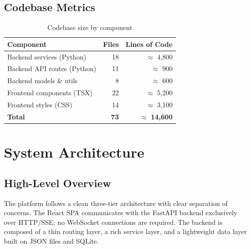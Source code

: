 \documentclass[12pt,a4paper]{article}
\begin{document}
\subsection{Codebase Metrics}

\begin{table}[H]
\centering
\caption{Codebase size by component}
\begin{tabular}{lrr}
\toprule
\textbf{Component} & \textbf{Files} & \textbf{Lines of Code} \\
\midrule
Backend services (Python)     & 18 & $\approx$ 4{,}800 \\
Backend API routes (Python)   & 11 & $\approx$ 900 \\
Backend models \& utils       &  8 & $\approx$ 600 \\
Frontend components (TSX)     & 22 & $\approx$ 5{,}200 \\
Frontend styles (CSS)         & 14 & $\approx$ 3{,}100 \\
\midrule
\textbf{Total}                & \textbf{73} & $\approx$ \textbf{14{,}600} \\
\bottomrule
\end{tabular}
\end{table}

\section{System Architecture}

\subsection{High-Level Overview}

The platform follows a clean three-tier architecture with clear separation of concerns.
The React SPA communicates with the FastAPI backend exclusively over HTTP/SSE; no WebSocket
connections are required. The backend is composed of a thin routing layer, a rich service
layer, and a lightweight data layer built on JSON files and SQLite.
\end{document}
